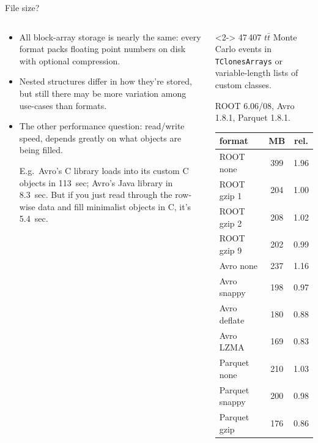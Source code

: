 \documentclass{beamer}
\begin{document}
\begin{frame}{File size?}
\vspace{0.35 cm}
\begin{columns}
\begin{column}{0.55\linewidth}
\begin{itemize}
\item<1-> All block-array storage is nearly the same: every format packs floating point numbers on disk with optional compression.

\item<2-> Nested structures differ in how they're stored, but still there may be more variation among use-cases than formats.

\item<3-> The other performance question: read/write speed, depends greatly on what objects are being filled.

\scriptsize
\vspace{0.25 cm}
E.g.\ Avro's C library loads into its custom C objects in 113~sec; Avro's Java library in 8.3~sec. But if you just read through the row-wise data and fill minimalist objects in C, it's 5.4~sec.

\end{itemize}
\end{column}
\begin{column}{0.5\linewidth}
\begin{uncoverenv}<2->
\scriptsize
47\,407 $t\bar{t}$ Monte Carlo events in {\tt TClonesArrays} or variable-length lists of custom classes.

\vspace{0.1 cm}
ROOT 6.06/08, Avro 1.8.1, Parquet 1.8.1.

\normalsize
\begin{center}
\begin{tabular}{l c c}
format         & MB  & rel. \\\hline
ROOT none      & 399 & 1.96 \\
ROOT gzip 1    & 204 & 1.00 \\
ROOT gzip 2    & 208 & 1.02 \\
ROOT gzip 9    & 202 & 0.99 \\\hline
Avro none      & 237 & 1.16 \\
Avro snappy    & 198 & 0.97 \\
Avro deflate   & 180 & 0.88 \\
Avro LZMA      & 169 & 0.83 \\\hline
Parquet none   & 210 & 1.03 \\
Parquet snappy & 200 & 0.98 \\
Parquet gzip   & 176 & 0.86 \\
\end{tabular}
\end{center}
\end{uncoverenv}
\end{column}
\end{columns}
\end{frame}
\end{document}
